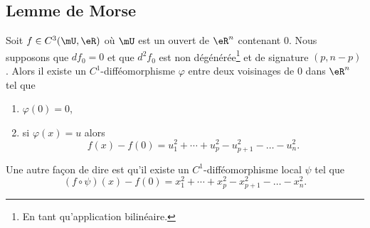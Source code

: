 \subsection{Lemme de Morse}

\begin{lemma}     \label{LemNQAmCLo}
    Soit \( f\in C^3(\mU,\eR)\) où \( \mU\) est un ouvert de \( \eR^n\) contenant \( 0\). Nous supposons que \( df_0=0\) et que \( d^2f_0\) est non dégénérée\footnote{En tant qu'application bilinéaire.} et de signature \( (p,n-p)\). Alors il existe un \( C^1\)-difféomorphisme \( \varphi\) entre deux voisinages de \( 0\) dans \( \eR^n\) tel que
    \begin{enumerate}
        \item
            \( \varphi(0)=0\),
        \item
            si \( \varphi(x)=u\) alors
            \begin{equation}
                f(x)-f(0)=u_1^2+\cdots +u_p^2-u_{p+1}^2-\ldots-u_n^2.
            \end{equation}
    \end{enumerate}
    Une autre façon de dire est qu'il existe un \( C^1\)-difféomorphisme local \( \psi\) tel que
    \begin{equation}
        (f\circ\psi)(x)-f(0)=x_1^2+\cdots +x_p^2-x_{p+1}^2-\ldots-x_n^2.
    \end{equation}
\end{lemma}

